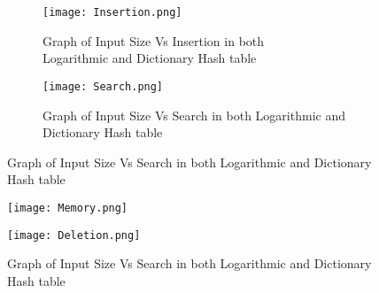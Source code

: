 \documentclass[a4paper,12pt, openany]{book}
\begin{document}
\begin{figure}
	\centering
	\begin{subfigure}{.55\textwidth}
		\centering
		\texttt{[image: Insertion.png]}
		\caption{Graph of Input Size Vs Insertion in both \\  Logarithmic and Dictionary Hash table}
		\label{fig:sub1}
	\end{subfigure}%
	\begin{subfigure}{.55\textwidth}
		\centering
		\texttt{[image: Search.png]}
		\caption{Graph of Input Size Vs Search in both Logarithmic and Dictionary Hash table}
		\label{fig:sub2}
	\end{subfigure}
	\label{fig:test}
\end{figure}

\begin{figure}
	\centering
	\begin{minipage}{.55\textwidth}
		\centering
		\texttt{[image: Memory.png]}
		\caption{Graph of Input Size Vs Memory in\\ both  Hash table}
		\label{fig:test1}
	\end{minipage}%
	\begin{minipage}{.55\textwidth}
		\centering
		\texttt{[image: Deletion.png]}
		\caption{Graph of Input Size Vs Search in both Logarithmic and Dictionary Hash table}
		\label{fig:test2}
	\end{minipage}
\end{figure}
\end{document}
